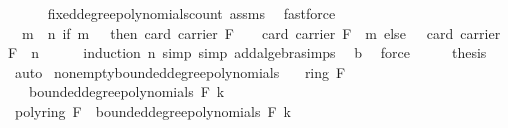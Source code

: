 \begin{isabellebody}
\ \ \ \ \isamarkupfalse%
\ fixed{\isacharunderscore}{\kern0pt}degree{\isacharunderscore}{\kern0pt}polynomials{\isacharunderscore}{\kern0pt}count\ assms\ \isamarkupfalse%
\ fastforce\isanewline
\ \ \isamarkupfalse%
\ \isamarkupfalse%
\ {\isachardoublequoteopen}{\isacharparenleft}{\kern0pt}{\isasymSum}\ m\ {\isasymle}\ n{\isachardot}{\kern0pt}\ if\ m\ {\isasymge}\ {}\ then\ {\isacharparenleft}{\kern0pt}card\ {\isacharparenleft}{\kern0pt}carrier\ F{\isacharparenright}{\kern0pt}\ {\isacharminus}{\kern0pt}\ {}{\isacharparenright}{\kern0pt}\ {\isacharasterisk}{\kern0pt}\ {\isacharparenleft}{\kern0pt}card\ {\isacharparenleft}{\kern0pt}carrier\ F{\isacharparenright}{\kern0pt}\ {\isacharcircum}{\kern0pt}\ {\isacharparenleft}{\kern0pt}m{\isacharminus}{\kern0pt}{}{\isacharparenright}{\kern0pt}{\isacharparenright}{\kern0pt}\ else\ {}{\isacharparenright}{\kern0pt}\ {\isacharequal}{\kern0pt}\ card\ {\isacharparenleft}{\kern0pt}carrier\ F{\isacharparenright}{\kern0pt}\ {\isacharcircum}{\kern0pt}\ n{\isachardoublequoteclose}\isanewline
\ \ \ \ \isamarkupfalse%
\ {\isacharparenleft}{\kern0pt}induction\ n{\isacharcomma}{\kern0pt}\ simp{\isacharcomma}{\kern0pt}\ simp\ add{\isacharcolon}{\kern0pt}algebra{\isacharunderscore}{\kern0pt}simps{\isacharparenright}{\kern0pt}\ \isamarkupfalse%
\ b\ \isamarkupfalse%
\ force\isanewline
\ \ \isamarkupfalse%
\ \isamarkupfalse%
\ {\isacharquery}{\kern0pt}thesis\ \isamarkupfalse%
\ auto\isanewline
{}\isamarkupfalse%
%
\endisatagproof
{\isafoldproof}%
%
\isadelimproof
\isanewline
%
\endisadelimproof
\isanewline
{}\isamarkupfalse%
\ non{\isacharunderscore}{\kern0pt}empty{\isacharunderscore}{\kern0pt}bounded{\isacharunderscore}{\kern0pt}degree{\isacharunderscore}{\kern0pt}polynomials{\isacharcolon}{\kern0pt}\isanewline
\ \ \ {\isachardoublequoteopen}ring\ F{\isachardoublequoteclose}\isanewline
\ \ \ {\isachardoublequoteopen}bounded{\isacharunderscore}{\kern0pt}degree{\isacharunderscore}{\kern0pt}polynomials\ F\ k\ {\isasymnoteq}\ {\isacharbraceleft}{\kern0pt}{\isacharbraceright}{\kern0pt}{\isachardoublequoteclose}\isanewline
%
\isadelimproof
%
\endisadelimproof
%
\isatagproof
{}\isamarkupfalse%
\ {\isacharminus}{\kern0pt}\isanewline
\ \ \isamarkupfalse%
\ {\isachardoublequoteopen}{\isasymzero}\isactrlbsub poly{\isacharunderscore}{\kern0pt}ring\ F\isactrlesub \ {\isasymin}\ bounded{\isacharunderscore}{\kern0pt}degree{\isacharunderscore}{\kern0pt}polynomials\ F\ k{\isachardoublequoteclose}\isanewline

\end{isabellebody}
